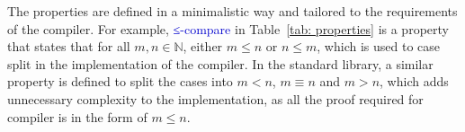 \documentclass[12pt,a4paper]{report}
\theoremstyle{definition}
\newcommand{\secref}[1]{\S\ref{#1}}
\newcommand{\mb}[1]{\textcolor{mediumblue}{#1}}
\newcommand{\og}[1]{\textcolor{orange}{#1}}
\newcommand{\mbt}[1]{\mb{\textsf{#1}}}
\newcommand{\bN}{\ensuremath{\mathbb{N}}}
\begin{document}
    The properties are defined in a minimalistic way and tailored to the requirements of the compiler. For example, \mbt{≤-compare} in Table~\ref{tab: properties} is a property that states that for all $m, n \in \bN$, either $m \leq n$ or $n \leq m$, which is used to case split in the implementation of the compiler. In the standard library, a similar property is defined to split the cases into $m < n$, $m \equiv n$ and $m > n$, which adds unnecessary complexity to the implementation, as all the proof required for compiler is in the form of $m \leq n$.



\end{document}

